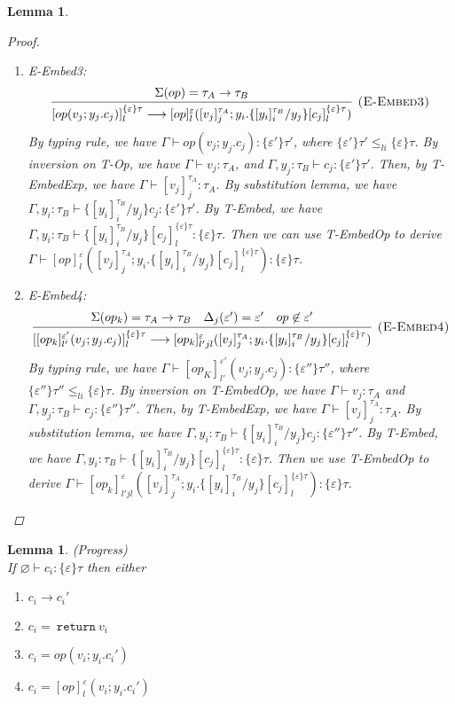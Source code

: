 \documentclass{article}
\newtheorem{lemma}[theorem]{Lemma}
\theoremstyle{definition}
\newcommand{\m}[1]{\ \texttt{#1}\ }
\begin{document}
\begin{lemma}
\begin{proof}
\begin{enumerate}
\item E-Embed3: 
$$
\infer[\textsc{(E-Embed3)}]
{[op(v_j; y_j.c_j)]^{\{\varepsilon\}\tau}_l \longrightarrow [op]^\varepsilon_l([v_j]^{\tau_A}_j; y_i. \{[y_i]^{\tau_B}_i / y_j\}[c_j]^{\{\varepsilon\}\tau}_l)}
{ \Sigma(op) = \tau_A \rightarrow \tau_B} 
$$
By typing rule, we have $\Gamma \vdash op(v_j; y_j.c_j) : \{\varepsilon'\}\tau'$, where $\{\varepsilon'\}\tau' \leq_{li} \{\varepsilon\}\tau$. By inversion on T-Op, we have $\Gamma \vdash v_j : \tau_A$, and $\Gamma, y_j : \tau_B \vdash c_j: \{\varepsilon'\}\tau'$. Then, by T-EmbedExp, we have $\Gamma \vdash [v_j]^{\tau_A}_j : \tau_A$. By substitution lemma, we have $\Gamma, y_i: \tau_B \vdash \{[y_i]^{\tau_B}_i/y_j\}c_j : \{\varepsilon'\}\tau'$. By T-Embed, we have $\Gamma, y_i: \tau_B \vdash \{[y_i]^{\tau_B}_i/y_j\}[c_j]^{\{\varepsilon\}\tau}_l : \{\varepsilon\}\tau$. Then we can use T-EmbedOp to derive $\Gamma \vdash [op]^\varepsilon_l([v_j]^{\tau_A}_j; y_i. \{[y_i]^{\tau_B}_i / y_j\}[c_j]^{\{\varepsilon\}\tau}_l): \{\varepsilon\}\tau$. 

\item E-Embed4:
$$
\infer[\textsc{(E-Embed4)}]
{[[op_k]^{\varepsilon'}_{l'}(v_j; y_j.c_j)]^{\{\varepsilon\}\tau}_l \longrightarrow [op_k]^\varepsilon_{l'jl}([v_j]^{\tau_A}_j; y_i. \{[y_i]^{\tau_B}_i / y_j\}[c_j]^{\{\varepsilon\}\tau}_l)}
{ \Sigma(op_k) = \tau_A \rightarrow \tau_B& \Delta_j(\varepsilon') = \varepsilon' & op \not \in \varepsilon'} 
$$
By typing rule, we have $\Gamma \vdash [op_K]^{\varepsilon'}_{l'}(v_j; y_j.c_j) : \{\varepsilon''\}\tau''$, where $\{\varepsilon''\}\tau'' \leq_{li} \{\varepsilon\}\tau$. By inversion on T-EmbedOp, we have $\Gamma \vdash v_j: \tau_A$ and $\Gamma, y_j : \tau_B \vdash c_j: \{\varepsilon''\}\tau''$. Then, by T-EmbedExp, we have $\Gamma \vdash [v_j]^{\tau_A}_j : \tau_A$.
By substitution lemma, we have $\Gamma, y_i: \tau_B \vdash \{[y_i]^{\tau_B}_i/y_j\}c_j : \{\varepsilon''\}\tau''$. By T-Embed, we have $\Gamma, y_i: \tau_B \vdash \{[y_i]^{\tau_B}_i/y_j\}[c_j]^{\{\varepsilon\}\tau}_l : \{\varepsilon\}\tau$. Then we use T-EmbedOp to derive $\Gamma \vdash [op_k]^\varepsilon_{l'jl}([v_j]^{\tau_A}_j; y_i. \{[y_i]^{\tau_B}_i / y_j\}[c_j]^{\{\varepsilon\}\tau}_l) : \{\varepsilon\}\tau$.
\end{enumerate}
\end{proof}
\end{lemma}

\begin{lemma} (Progress) \\
If $\varnothing \vdash c_i : \{\varepsilon\} \tau$ then either
\begin{enumerate}
\item  $c_i \longrightarrow c_i'$ 
\item  $c_i = \m{return} v_i$
\item $c_i = op(v_i; y_i.c_i')$
\item $c_i = [op]^\varepsilon_l(v_i; y_i.c_i')$
 \end{enumerate}
\end{lemma}
\end{document}
